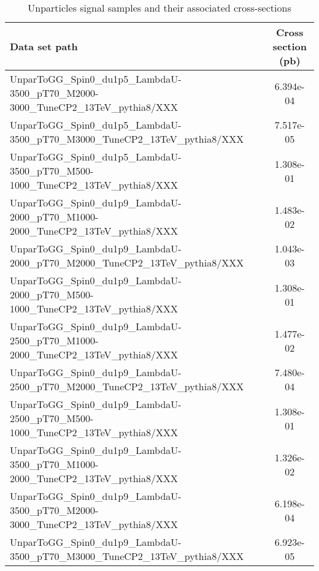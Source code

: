\begin{landscape}
\begin{table}[!htbp]
       \caption{ Unparticles signal samples and their associated cross-sections }
       \centering
       \vspace{\baselineskip}
       \begin{tabular}{lc}
       \hline \hline
       Data set path & Cross section (pb)\\
       \hline
       UnparToGG\_Spin0\_du1p5\_LambdaU-3500\_pT70\_M2000-3000\_TuneCP2\_13TeV\_pythia8/XXX & 6.394e-04\\
       UnparToGG\_Spin0\_du1p5\_LambdaU-3500\_pT70\_M3000\_TuneCP2\_13TeV\_pythia8/XXX & 7.517e-05\\
       UnparToGG\_Spin0\_du1p5\_LambdaU-3500\_pT70\_M500-1000\_TuneCP2\_13TeV\_pythia8/XXX & 1.308e-01\\
       UnparToGG\_Spin0\_du1p9\_LambdaU-2000\_pT70\_M1000-2000\_TuneCP2\_13TeV\_pythia8/XXX & 1.483e-02\\
       UnparToGG\_Spin0\_du1p9\_LambdaU-2000\_pT70\_M2000\_TuneCP2\_13TeV\_pythia8/XXX & 1.043e-03\\
       UnparToGG\_Spin0\_du1p9\_LambdaU-2000\_pT70\_M500-1000\_TuneCP2\_13TeV\_pythia8/XXX & 1.308e-01\\
       UnparToGG\_Spin0\_du1p9\_LambdaU-2500\_pT70\_M1000-2000\_TuneCP2\_13TeV\_pythia8/XXX & 1.477e-02\\
       UnparToGG\_Spin0\_du1p9\_LambdaU-2500\_pT70\_M2000\_TuneCP2\_13TeV\_pythia8/XXX & 7.480e-04\\
       UnparToGG\_Spin0\_du1p9\_LambdaU-2500\_pT70\_M500-1000\_TuneCP2\_13TeV\_pythia8/XXX & 1.308e-01\\
       UnparToGG\_Spin0\_du1p9\_LambdaU-3500\_pT70\_M1000-2000\_TuneCP2\_13TeV\_pythia8/XXX & 1.326e-02\\
       UnparToGG\_Spin0\_du1p9\_LambdaU-3500\_pT70\_M2000-3000\_TuneCP2\_13TeV\_pythia8/XXX & 6.198e-04\\
       UnparToGG\_Spin0\_du1p9\_LambdaU-3500\_pT70\_M3000\_TuneCP2\_13TeV\_pythia8/XXX & 6.923e-05\\
       \hline \hline
       \end{tabular}
       \label{table:Unpar_signal_samples_xsec}
\end{table}
\end{landscape}




